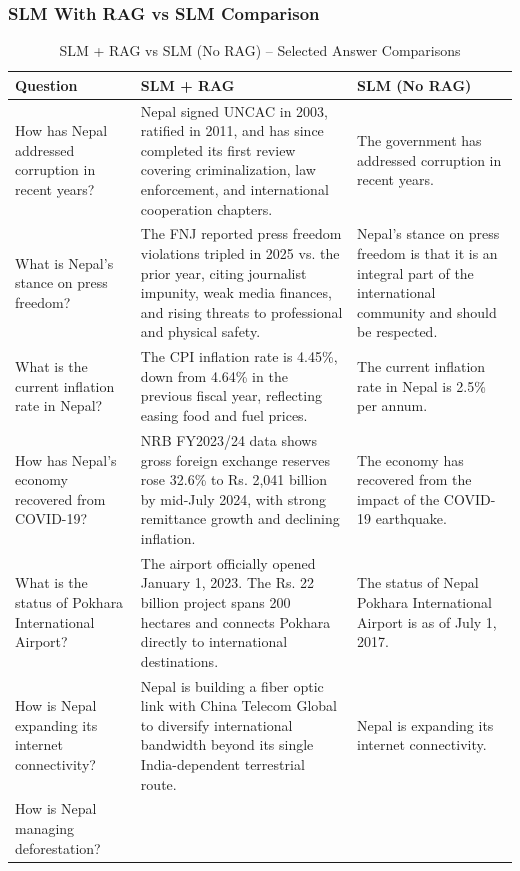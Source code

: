 \subsubsection{SLM With RAG vs SLM Comparison}
\begin{table}[H]
\caption{SLM + RAG vs SLM (No RAG) -- Selected Answer Comparisons}
\label{tab:rag_comparison}
\centering
\scriptsize
\begin{tabular}{|p{3.5cm}|p{5.5cm}|p{5.5cm}|}
\hline
\textbf{Question} & \textbf{SLM + RAG} & \textbf{SLM (No RAG)} \\
\hline
How has Nepal addressed corruption in recent years? &
Nepal signed UNCAC in 2003, ratified in 2011, and has since completed its first review covering criminalization, law enforcement, and international cooperation chapters. &
The government has addressed corruption in recent years. \\
\hline
What is Nepal's stance on press freedom? &
The FNJ reported press freedom violations tripled in 2025 vs. the prior year, citing journalist impunity, weak media finances, and rising threats to professional and physical safety. &
Nepal's stance on press freedom is that it is an integral part of the international community and should be respected. \\
\hline
What is the current inflation rate in Nepal? &
The CPI inflation rate is 4.45\%, down from 4.64\% in the previous fiscal year, reflecting easing food and fuel prices. &
The current inflation rate in Nepal is 2.5\% per annum. \\
\hline
How has Nepal's economy recovered from COVID-19? &
NRB FY2023/24 data shows gross foreign exchange reserves rose 32.6\% to Rs. 2,041 billion by mid-July 2024, with strong remittance growth and declining inflation. &
The economy has recovered from the impact of the COVID-19 earthquake. \\
\hline
What is the status of Pokhara International Airport? &
The airport officially opened January 1, 2023. The Rs. 22 billion project spans 200 hectares and connects Pokhara directly to international destinations. &
The status of Nepal Pokhara International Airport is as of July 1, 2017. \\
\hline
How is Nepal expanding its internet connectivity? &
Nepal is building a fiber optic link with China Telecom Global to diversify international bandwidth beyond its single India-dependent terrestrial route. &
Nepal is expanding its internet connectivity. \\
\hline
How is Nepal managing deforestation? &

\end{tabular}
\end{table}
